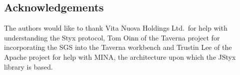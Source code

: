 \documentclass[a4paper]{article}
\begin{document}
\begin{multicols}{2}
\section*{Acknowledgements}
The authors would like to thank Vita Nuova Holdings Ltd.\ for help with understanding the Styx protocol, Tom Oinn of the Taverna project for incorporating the SGS into the Taverna workbench and Trustin Lee of the Apache project for help with MINA, the architecture upon which the JStyx library is based.

\end{multicols}



\end{document}
